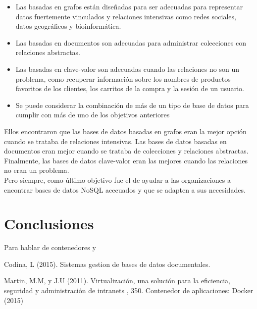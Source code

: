\documentclass[twoside,twocolumn]{article}
\begin{document}
\begin{itemize}	
	\item Las basadas en grafos están diseñadas para ser adecuadas para representar datos fuertemente vinculados y relaciones intensivas como redes sociales, datos geográficos y bioinformática.
	\item Las basadas en documentos son adecuadas para administrar colecciones con relaciones abstractas.
	\item Las basadas en clave-valor son adecuadas cuando las relaciones no son un problema, como recuperar información sobre los nombres de productos favoritos de los clientes, los carritos de la compra y la sesión de un usuario.
	\item Se puede considerar la combinación de más de un tipo de base de datos para cumplir con más de uno de los objetivos anteriores
\end{itemize}

Ellos encontraron que las bases de datos basadas en grafos eran la mejor opción cuando se trataba de relaciones intensivas. Las bases de datos basadas en documentos eran mejor cuando se trataba de colecciones y relaciones abstractas. Finalmente, las bases de datos clave-valor eran las mejores cuando las relaciones no eran un problema. \\
Pero siempre, como último objetivo fue el de ayudar a las organizaciones a encontrar bases de datos NoSQL acecuados y que se adapten a sus necesidades. 

\section{Conclusiones}

Para hablar de contenedores y

\begin{thebibliography}{99} %
Codina, L (2015).
\newblock Sistemas gestion de bases de datos documentales.


Martin, M.M,  y J.U (2011).
\newblock Virtualización, una solución para la eficiencia,
seguridad y administración de intranets
, 350.
\newblock Contenedor de aplicaciones: Docker (2015)
 
 
\end{thebibliography}

\end{document}
